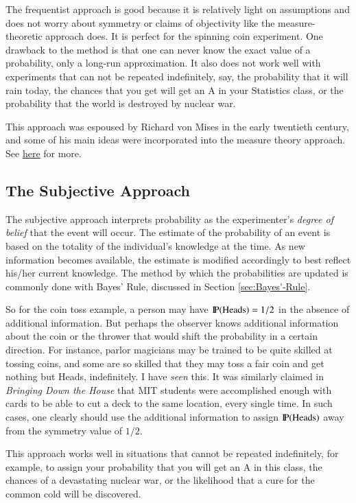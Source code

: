 \documentclass[captions=tableheading]{scrbook}
\begin{document}
The frequentist approach is good because it is relatively light on assumptions and does not worry about symmetry or claims of objectivity like the measure-theoretic approach does. It is perfect for the spinning coin experiment. One drawback to the method is that one can never know the exact value of a probability, only a long-run approximation. It also does not work well with experiments that can not be repeated indefinitely, say, the probability that it will rain today, the chances that you get will get an A in your Statistics class, or the probability that the world is destroyed by nuclear war.

This approach was espoused by Richard von Mises in the early twentieth century, and some of his main ideas were incorporated into the measure theory approach. See \href{http://www-history.mcs.st-andrews.ac.uk/Biographies/Mises.html}{here} for more.
\subsection{The Subjective Approach}
\label{sec-4-3-3}


The subjective approach interprets probability as the experimenter's \emph{degree of belief} that the event will occur. The estimate of the probability of an event is based on the totality of the individual's knowledge at the time. As new information becomes available, the estimate is modified accordingly to best reflect his/her current knowledge. The method by which the probabilities are updated is commonly done with Bayes' Rule, discussed in Section \ref{sec:Bayes'-Rule}. 

So for the coin toss example, a person may have \(\P(\mbox{Heads})=1/2\) in the absence of additional information. But perhaps the observer knows additional information about the coin or the thrower that would shift the probability in a certain direction. For instance, parlor magicians may be trained to be quite skilled at tossing coins, and some are so skilled that they may toss a fair coin and get nothing but Heads, indefinitely. I have \emph{seen} this. It was similarly claimed in \emph{Bringing Down the House} \cite{Mezrich2003} that MIT students were accomplished enough with cards to be able to cut a deck to the same location, every single time. In such cases, one clearly should use the additional information to assign \(\P(\mbox{Heads})\) away from the symmetry value of \(1/2\).

This approach works well in situations that cannot be repeated indefinitely, for example, to assign your probability that you will get an A in this class, the chances of a devastating nuclear war, or the likelihood that a cure for the common cold will be discovered.
\end{document}
